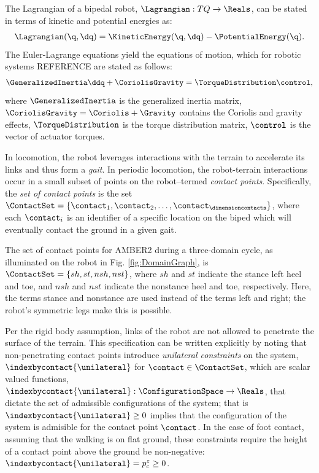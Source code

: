 The Lagrangian of a bipedal robot, $\Lagrangian : TQ \to \Reals$, can be stated in terms of kinetic and potential energies as:
\begin{align}
 \nonumber
 \Lagrangian(\q,\dq) = \KineticEnergy(\q,\dq) - \PotentialEnergy(\q).
\end{align}
The Euler-Lagrange equations yield the equations of motion, which for robotic systems REFERENCE are stated as follows:
\begin{align}
 \GeneralizedInertia\ddq + \CoriolisGravity = \TorqueDistribution \control,
 \label{eq_eulerlagrange}
\end{align}
where $\GeneralizedInertia$ is the generalized inertia matrix, $\CoriolisGravity = \Coriolis + \Gravity$ contains the Coriolis and gravity effects, $\TorqueDistribution$ is the torque distribution matrix, $\control$ is the vector of actuator torques.

 In locomotion, the robot leverages interactions with the terrain to accelerate its links and thus form a \textit{gait}. In periodic locomotion, the robot-terrain interactions occur in a small subset of points on the robot--termed \textit{contact points}. Specifically, the \textit{set of contact points} is the set $\ContactSet = \{ \contact_1, \contact_2, \ldots, \contact_\dimensioncontacts\}$, where each $\contact_i$ is an identifier of a specific location on the biped which will eventually contact the ground in a given gait.

\begin{myexample}
 The set of contact points for AMBER2 during a three-domain cycle, as illuminated on the robot in Fig. \ref{fig:DomainGraph}, is $\ContactSet = \{sh, st, nsh, nst \}$, where $sh$ and $st$ indicate the stance left heel and toe, and $nsh$ and $nst$ indicate the nonstance heel and toe, respectively. Here, the terms stance and nonstance are used instead of the terms left and right; the robot's symmetric legs make this is possible.
\end{myexample}

Per the rigid body assumption, links of the robot are not allowed to penetrate the surface of the terrain. This specification can be written explicitly by noting that non-penetrating contact points introduce \textit{unilateral constraints} on the system, $\indexbycontact{\unilateral}$ for $\contact \in \ContactSet$, which are scalar valued functions, $\indexbycontact{\unilateral} : \ConfigurationSpace \to \Reals$, that dictate the set of admissible configurations of the system; that is $\indexbycontact{\unilateral} \geq 0$ implies that the configuration of the system is admisible for the contact point $\contact$. In the case of foot contact, assuming that the walking is on flat ground, these constraints require the height of a contact point above the ground be non-negative: $\indexbycontact{\unilateral} = p_c^z \geq 0$.


